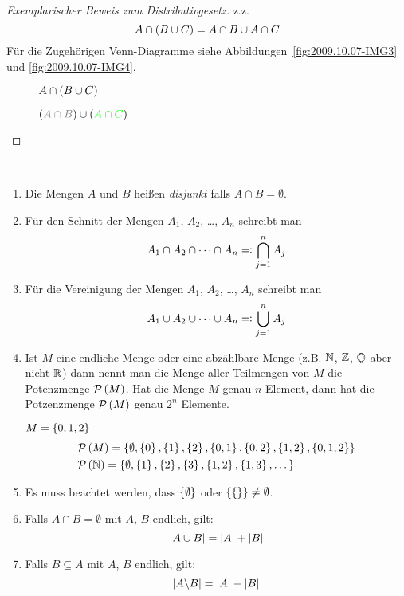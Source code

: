 \begin{proof}[Exemplarischer Beweis zum Distributivgesetz]
\ac{z.z.}
\[A \cap \left(B \cup C\right) = A \cap B \cup A \cap C\]
Für die Zugehörigen Venn-Diagramme siehe Abbildungen~\vref{fig:2009.10.07-IMG3} und \vref{fig:2009.10.07-IMG4}.
\begin{figure}[htb]
\centering

\caption{$A \cap \left(B \cup C\right)$}
\label{fig:2009.10.07-IMG3}
\end{figure}

\begin{figure}[htb]
\centering

\caption{\textcolor{blue}{$\rk{\textcolor{gray}{A \cap B}} \cup \rk{\textcolor{green}{A \cap C}}$}}
\label{fig:2009.10.07-IMG4}
\end{figure}
\end{proof}

\begin{definition}~
\begin{enumerate}
\item Die Mengen $A$ und $B$ heißen \emph{disjunkt} falls $A \cap B = \emptyset$.
\item Für den Schnitt der Mengen $A_1$, $A_2$, \dots, $A_n$ schreibt man \[A_1 \cap A_2 \cap \dots \cap A_n \mathrel{=\!\!\mathop:} \bigcap_{j = 1}^{n} A_j\]
\item Für die Vereinigung der Mengen $A_1$, $A_2$, \dots, $A_n$ schreibt man \[A_1 \cup A_2 \cup \dots \cup A_n \mathrel{=\!\!\mathop:} \bigcup_{j = 1}^{n} A_j\]
\item Ist $M$ eine endliche Menge oder eine abzählbare Menge (\ac{z.B.} $\mathbb{N}$, $\mathbb{Z}$, $\mathbb{Q}$ aber nicht $\mathbb{R}$) dann nennt man die Menge aller Teilmengen von $M$ die Potenzmenge $\mathcal{P}\left(M\right)$. Hat die Menge $M$ genau $n$ Element, dann hat die Potzenzmenge $\mathcal{P}\left(M\right)$ genau $2^n$ Elemente.
	\begin{example}
	$M = \left\{0, 1, 2\right\}$
	\begin{align*}
	&\mathcal{P}\left(M\right) = \left\{\emptyset, \left\{0\right\}, \left\{1\right\}, \left\{2\right\}, \left\{0,1\right\}, \left\{0,2\right\}, \left\{1,2\right\}, \left\{0,1,2\right\}\right\}\\
	&\mathcal{P}\left(\mathbb{N}\right) = \left\{\emptyset, \left\{1\right\}, \left\{2\right\}, \left\{3\right\}, \left\{1,2\right\}, \left\{1,3\right\}, \dots\right\}
	\end{align*}
	\end{example}

\item Es muss beachtet werden, dass $\left\{\emptyset\right\}$ oder $\left\{\left\{\right\}\right\} \neq \emptyset$.
\item Falls $A \cap B = \emptyset$ mit $A$, $B$ endlich, gilt: \[\left|A \cup B\right| = \left|A\right| + \left|B\right|\]
\item Falls $B \subseteq A$ mit $A$, $B$ endlich, gilt: \[\left|A \backslash B\right| = \left|A\right| - \left|B\right|\]
\end{enumerate}
\end{definition}

